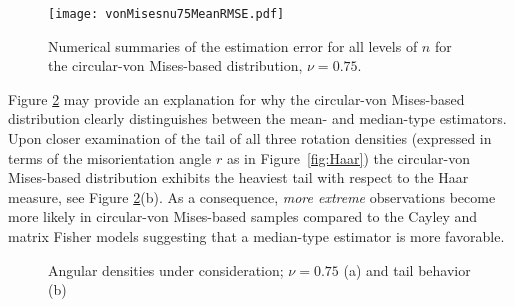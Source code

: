\begin{figure}
\centering
\texttt{[image: vonMisesnu75MeanRMSE.pdf]}
\caption{Numerical summaries of the estimation error for all levels of $n$ for the circular-von Mises-based distribution,  $\nu=0.75$.  \label{fig:vmnu75}}
\end{figure}

\noindent Figure \ref{fig:dendetail} may provide an explanation for why the circular-von Mises-based distribution clearly distinguishes between the mean- and median-type estimators.  Upon closer examination of the tail of all three rotation densities (expressed in terms of the misorientation angle $r$ as in Figure~\ref{fig:Haar}) the circular-von Mises-based distribution exhibits the heaviest tail with respect to the Haar measure, see Figure \ref{fig:dendetail}(b). As a consequence, \textit{more extreme} observations become more likely in circular-von Mises-based samples compared to the Cayley and matrix Fisher models suggesting that a median-type estimator is more favorable. 
\begin{figure}[h!]
\centering
{}
\caption{Angular densities under consideration; $\nu=0.75$ (a) and tail behavior (b) }
\label{fig:dendetail}
\end{figure}

